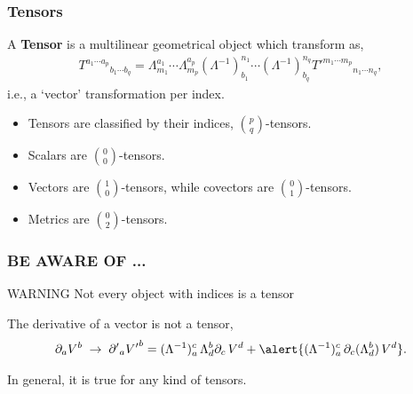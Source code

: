 \begin{frame}
  \frametitle{Tensors}
  \begin{definition}
    A \alert{\bf Tensor} is a multilinear geometrical  object which transform as,
    \begin{align*}
      T^{a_1\cdots a_p}{}_{b_1\cdots b_q} =  \Lambda^{a_1}_{m_1} \cdots  \Lambda^{a_p}_{m_p}(\Lambda^{-1})^{n_1}_{b_1} \cdots (\Lambda^{-1})^{n_q}_{b_q} {T'}^{m_1\cdots m_p}{}_{n_1\cdots n_q},
    \end{align*}
    i.e., a `vector' transformation per index.
  \end{definition}
  \begin{itemize}
  \item Tensors are classified by their indices, $\binom{p}{q}$-tensors.
  \item Scalars are $\binom{0}{0}$-tensors.
  \item Vectors are $\binom{1}{0}$-tensors, while covectors are $\binom{0}{1}$-tensors.
  \item Metrics are $\binom{0}{2}$-tensors.
  \end{itemize}
\end{frame}


\begin{frame}
  \frametitle{BE AWARE OF ...}
  \begin{alertblock}{WARNING}
    Not every object with indices is a  tensor
  \end{alertblock}
  \begin{example}
    The derivative of a vector is not a tensor,
    \begin{align*}
      \partial_a V^b \;\to \;{\partial'}_a {V'}^b = (\Lambda^{-1})_a^c\, \Lambda^b_d\partial_c\, V^d + \alert{(\Lambda^{-1})_a^c\,\partial_c(\Lambda^b_d) \,V^d }.
    \end{align*}

    In general, it is true for any kind of tensors.
  \end{example}
\end{frame}


